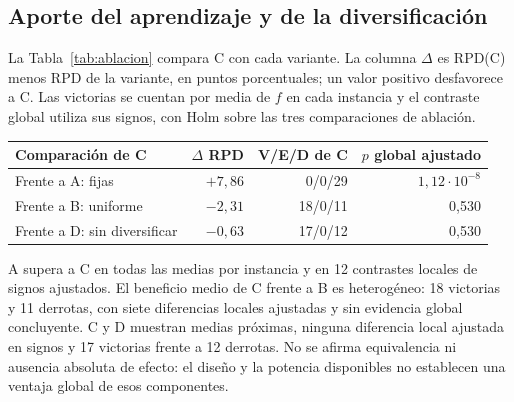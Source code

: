 \documentclass[11pt,a4paper]{article}
\begin{document}
\newpage
\subsection{Aporte del aprendizaje y de la diversificación}
La Tabla~\ref{tab:ablacion} compara C con cada variante. La columna $\Delta$ es RPD(C) menos RPD de la variante, en puntos porcentuales; un valor positivo desfavorece a C. Las victorias se cuentan por media de $f$ en cada instancia y el contraste global utiliza sus signos, con Holm sobre las tres comparaciones de ablación.
\begin{center}\small
\begin{tabularx}{\linewidth}{@{}Yrrr@{}}\toprule
Comparación de C & $\Delta$ RPD & V/E/D de C & $p$ global ajustado\\\midrule
Frente a A: fijas & $+7,86$ & 0/0/29 & $1,12\cdot10^{-8}$\\
Frente a B: uniforme & $-2,31$ & 18/0/11 & 0,530\\
Frente a D: sin diversificar & $-0,63$ & 17/0/12 & 0,530\\\bottomrule
\end{tabularx}
\label{tab:ablacion}
\end{center}
A supera a C en todas las medias por instancia y en 12 contrastes locales de signos ajustados. El beneficio medio de C frente a B es heterogéneo: 18 victorias y 11 derrotas, con siete diferencias locales ajustadas y sin evidencia global concluyente. C y D muestran medias próximas, ninguna diferencia local ajustada en signos y 17 victorias frente a 12 derrotas. No se afirma equivalencia ni ausencia absoluta de efecto: el diseño y la potencia disponibles no establecen una ventaja global de esos componentes.
\end{document}
